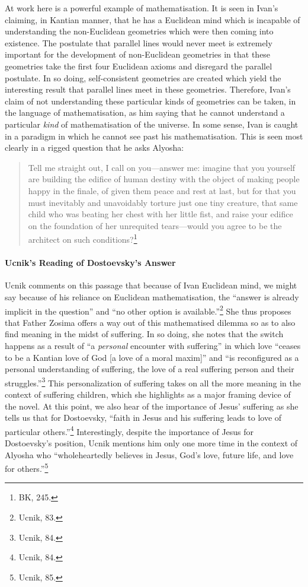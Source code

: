 \documentclass[12pt]{article}
\begin{document}
	At work here is a powerful example of mathematisation. It is seen in Ivan's claiming, in Kantian manner, that he has a Euclidean mind which is incapable of understanding the non-Euclidean geometries which were then coming into existence. The postulate that parallel lines would never meet is extremely important for the development of non-Euclidean geometries in that these geometries take the first four Euclidean axioms and disregard the parallel postulate. In so doing, self-consistent geometries are created which yield the interesting result that parallel lines meet in these geometries. Therefore, Ivan's claim of not understanding these particular kinds of geometries can be taken, in the language of mathematisation, as him saying that he cannot understand a particular \emph{kind} of mathematisation of the universe. In some sense, Ivan is caught in a paradigm in which he cannot see past his mathematisation. This is seen most clearly in a rigged question that he asks Alyosha:
	
	\begin{quote}
	\footnotesize
	\singlespacing
	
	Tell me straight out, I call on you---answer me: imagine that you yourself are building the edifice of human destiny with the object of making people happy in the finale, of given them peace and rest at last, but for that you must inevitably and unavoidably torture just one tiny creature, that same child who was beating her chest with her little fist, and raise your edifice on the foundation of her unrequited tears---would you agree to be the architect on such conditions?\footnote{BK, 245.}

	\end{quote}
	
	\paragraph*{Ucnik's Reading of Dostoevsky's Answer} Ucnik comments on this passage that because of Ivan Euclidean mind, we might say because of his reliance on Euclidean mathematisation, the ``answer is already implicit in the question'' and ``no other option is available.''\footnote{Ucnik, 83.} She thus proposes that Father Zosima offers a way out of this mathematised dilemma so as to also find meaning in the midst of suffering. In so doing, she notes that the switch happens as a result of ``a \emph{personal} encounter with suffering'' in which love ``ceases to be a Kantian love of God [a love of a moral maxim]'' and ``is reconfigured as a personal understanding of suffering, the love of a real suffering person and their struggles.''\footnote{Ucnik, 84.} This personalization of suffering takes on all the more meaning in the context of suffering children, which she highlights as a major framing device of the novel. At this point, we also hear of the importance of Jesus' suffering as she tells us that for Dostoevsky, ``faith in Jesus and his suffering leads to love of particular others.''\footnote{Ucnik, 84.} Interestingly, despite the importance of Jesus for Dostoevsky's position, Ucnik mentions him only one more time in the context of Alyosha who ``wholeheartedly believes in Jesus, God's love, future life, and love for others.''\footnote{Ucnik, 85.}
	
\end{document}
